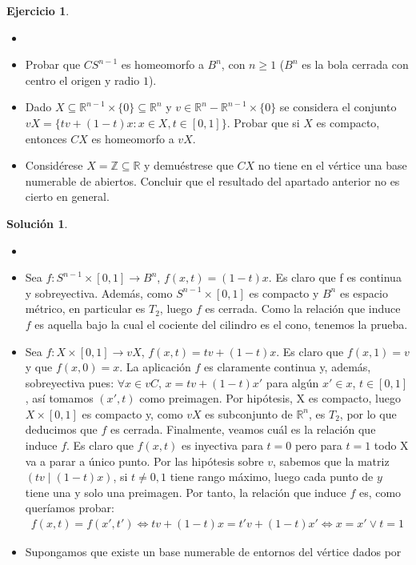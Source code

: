 \documentclass{article}
\theoremstyle{plain}
\theoremstyle{definition}
\newtheorem{exercise}{Ejercicio}
\newtheorem*{sol*}{Solución}
\newcommand{\R}{\mathbb{R}}
\begin{document}
\newpage
\begin{exercise}
\begin{itemize}
\item[]
	\item Probar que $C S^{n-1}$ es homeomorfo a $B^n$, con $n \geq 1$ ($B^n$ es la bola cerrada con centro el origen y radio $1$).
	\item Dado $X \subseteq \mathbb{R}^{n-1} \times \{0\} \subseteq \mathbb{R}^n$ y $v \in \mathbb{R}^n-\mathbb{R}^{n-1} \times \{0\}$ se considera el conjunto $vX = \{ tv + (1-t)x : x \in X, t \in [0,1]\}$. Probar que si $X$ es compacto, entonces $C X$ es homeomorfo a $vX$.
	\item Considérese $X = \mathbb{Z} \subseteq \mathbb{R}$ y demuéstrese que $C X$ no tiene en el vértice una base numerable de abiertos. Concluir que el resultado del apartado anterior no es cierto en general.
\end{itemize}
\begin{sol*}
\begin{itemize}
\item[]
\item Sea $f:S^{n-1}\times [0,1] \to B^n$, $f(x,t) = (1-t)x$. Es claro que f es continua y sobreyectiva. Además, como $S^{n-1}\times [0,1]$ es compacto y $B^n$ es espacio métrico, en particular es $T_2$, luego $f$ es cerrada. Como la relación que induce $f$ es aquella bajo la cual el cociente del cilindro es el cono, tenemos la prueba.
\item Sea $f:X\times [0,1] \to vX$, $f(x,t) = tv + (1-t)x$. Es claro que $f(x,1)= v$ y que $f(x,0)=x$. La aplicación $f$ es claramente continua y, además, sobreyectiva pues: $\forall x\in vC$, $x = tv + (1-t)x'$ para algún $x'\in x$, $t\in [0,1]$, así tomamos $(x',t)$ como preimagen. Por hipótesis, X es compacto, luego $X\times [0,1]$ es compacto y, como $vX$ es subconjunto de $\R^n$, es $T_2$, por lo que deducimos que $f$ es cerrada. Finalmente, veamos cuál es la relación que induce $f$. Es claro que $f(x,t)$ es inyectiva para $t=0$ pero para $t=1$ todo X va a parar a único punto. Por las hipótesis sobre $v$, sabemos que la matriz $\left(tv \mid (1-t)x\right)$, si $t\neq 0,1$ tiene rango máximo, luego cada punto de $y$ tiene una y solo una preimagen. Por tanto, la relación que induce $f$ es, como queríamos probar:
\begin{gather*}
f(x,t) = f(x',t') \Leftrightarrow tv + (1-t)x = t'v + (1-t)x' \Leftrightarrow x = x' \lor t = 1
\end{gather*}
\item Supongamos que existe un base numerable de entornos del vértice dados por

\end{itemize}
\end{sol*}
\end{exercise}
\end{document}

